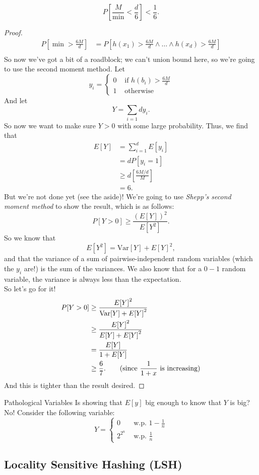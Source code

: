 \documentclass{notes}
\begin{document}
\begin{lemma}
  $$P\left[\frac{M}{\min} < \frac{d}{6}\right] < \frac{1}{6}.$$
\end{lemma}
\begin{proof}
  \begin{align*}
    P\left[\min > \frac{6M}{d}\right] &= P\left[h(x_1) > \frac{6M}{d} \wedge \ldots \wedge h(x_d) > \frac{6M}{d}\right] \\
  \end{align*}
  So now we've got a bit of a roadblock; we can't union bound here, so we're going to use the second
  moment method. Let $$y_i = \begin{cases}
    0 &\text{ if } h(b_i) > \frac{6M}{d} \\
    1 &\text{ otherwise}
  \end{cases}$$
  And let $$Y = \sum_{i = 1}{d} y_i.$$ So now we want to make sure $Y > 0$ with some large probability.
  Thus, we find that 
  \begin{align*}
    E[Y] &= \sum_{i = 1}^d E[y_i] \\
         &= dP[y_i = 1] \\
         &\geq d\left[\frac{6M/d}{M}\right] \\
         &= 6.
  \end{align*}
  But we're not done yet (see the aside)! We're going to use \emph{Shepp's second moment method} to show
  the result, which is as follows: $$P[Y > 0] \geq \frac{\left(E[Y]\right)^2}{E\left[Y^2\right]}.$$
  So we know that $$E\left[Y^2\right] = \textrm{Var}[Y] + {E[Y]}^2,$$ and that the variance of a sum
  of pairwise-independent random variables (which the $y_i$ are!) is the sum of the variances. We also
  know that for a $0 - 1$ random variable, the variance is always less than the expectation. \\

  So let's go for it!
  \begin{align*}
    P[Y > 0] &\geq \frac{{E[Y]}^2}{\textrm{Var}[Y] + {E[Y]}^2} \\
             &\geq \frac{{E[Y]}^2}{E[Y] + {E[Y]}^2} \\
             &= \frac{E[Y]}{1 + E[Y]} \\
             &\geq \frac{6}{7}. \qquad\text{(since $\frac{1}{1 + x}$ is increasing)} 
  \end{align*}
  And this is tighter than the result desired.
\end{proof}

\begin{aside}{Pathological Variables}
  Is showing that $E[y]$ big enough to know that $Y$ is big? No! Consider the following variable:
$$Y = \begin{cases} 0 &\text{ w.p. } 1 - \frac{1}{n} \\ 2^{2^n} &\text{ w.p. } \frac{1}{n}\end{cases}$$
\end{aside}

\subsection{Locality Sensitive Hashing (LSH)}
\end{document}
